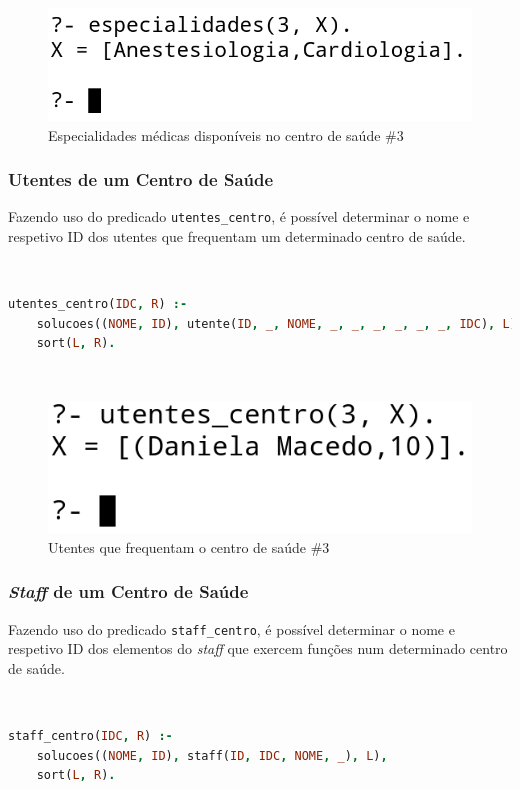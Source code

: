 \documentclass[a4paper, 11pt]{article}
\begin{document}
\

\begin{figure}[H]
    \centering
    \includegraphics[width=.45\textwidth]{img/especialidades.png}
    \caption{Especialidades médicas disponíveis no centro de saúde \#3}
\end{figure}

\subsubsection{Utentes de um Centro de Saúde}

Fazendo uso do predicado \texttt{utentes\_centro}, é possível determinar o nome e respetivo ID dos utentes que
frequentam um determinado centro de saúde.

\

\begin{lstlisting}[language=Prolog, caption={Extensão do predicado \texttt{utentes\_centro}}]
% Extensao do predicado utentes_centro: IDC, R -> {V, F}
utentes_centro(IDC, R) :- 
    solucoes((NOME, ID), utente(ID, _, NOME, _, _, _, _, _, _, IDC), L),
    sort(L, R).
\end{lstlisting}

\

\begin{figure}[H]
    \centering
    \includegraphics[width=.35\textwidth]{img/utentes_centro.png}
    \caption{Utentes que frequentam o centro de saúde \#3}
\end{figure}

\subsubsection{\textit{Staff} de um Centro de Saúde}

Fazendo uso do predicado \texttt{staff\_centro}, é possível determinar o nome e respetivo ID dos elementos do
\textit{staff} que exercem funções num determinado centro de saúde.

\

\begin{lstlisting}[language=Prolog, caption={Extensão do predicado \texttt{staff\_centro}}]
% Extensao do predicado staff_centro: IDC, R -> {V, F}
staff_centro(IDC, R) :- 
    solucoes((NOME, ID), staff(ID, IDC, NOME, _), L),
    sort(L, R).
\end{lstlisting}
\end{document}
